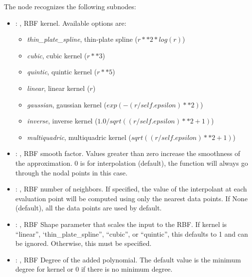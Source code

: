 \begin{itemize}
      The  node recognizes the following subnodes:
      \begin{itemize}
        \item {}: , 
          RBF kernel.                                                  Available options are:
          \begin{itemize}                                                  \item
          \textit{thin\_plate\_spline}, thin-plate spline ($r**2 * log(r)$)
          \item \textit{cubic}, cubic kernel ($r**3$)
          \item \textit{quintic}, quintic kernel ($r**5$)
          \item \textit{linear}, linear kernel ($r$)
          \item \textit{gaussian}, gaussian kernel ($exp(-(r/self.epsilon)**2)$)
          \item \textit{inverse}, inverse kernel ($1.0/sqrt((r/self.epsilon)**2 + 1)$)
          \item \textit{multiquadric}, multiquadric kernel ($sqrt((r/self.epsilon)**2 + 1)$)
          \end{itemize}

        \item {}: , 
          RBF smooth factor. Values greater than zero increase the smoothness of the approximation.
          0 is for interpolation (default), the function will always go through the nodal points in
          this case.

        \item {}: , 
          RBF number of neighbors. If specified, the value of the interpolant at each
          evaluation point will be computed using only the nearest data points.
          If None (default), all the data points are used by default.

        \item {}: , 
          RBF Shape parameter that scales the input to the RBF.
          If kernel is ``linear'', ‘thin\_plate\_spline'', ``cubic'', or ``quintic'', this
          defaults to 1 and can be ignored. Otherwise, this must be specified.

        \item {}: , 
          RBF Degree of the added polynomial. The default value is
          the minimum degree for kernel or 0 if there is no minimum degree.


\end{itemize}
\end{itemize}
